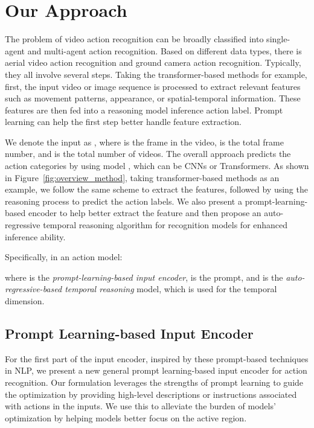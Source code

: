 \documentclass[letterpaper, 10 pt, conference]{ieeeconf}
\begin{document}
 

\section{Our Approach}
The problem of video action recognition can be broadly classified into single-agent and multi-agent action recognition. Based on different data types, there is aerial video action recognition and ground camera action recognition. Typically, they all involve several steps. Taking the transformer-based methods for example,  first, the input video or image sequence is processed to extract relevant features such as movement patterns, appearance, or spatial-temporal information. These features are then fed into a reasoning model inference action label.  Prompt learning can help the first step better handle feature extraction.



We denote the input as , where  is the  frame in the  video,  is the total frame number, and  is the total number of videos. The overall approach predicts the action categories by using model , which can be CNNs or Transformers. As shown in Figure~\ref{fig:overview_method}, taking transformer-based methods as an example, we follow the same scheme to extract the features, followed by using the reasoning process to predict the action labels. We also present a prompt-learning-based encoder to help better extract the feature and then propose an auto-regressive temporal reasoning algorithm for recognition models for enhanced inference ability.

Specifically, in an action model:
 
 where  is the \emph{prompt-learning-based input encoder},  is the prompt, and  is the \emph{auto-regressive-based temporal reasoning} model, which is used for the temporal dimension. 
 


\subsection{Prompt Learning-based Input Encoder}
For the first part of the input encoder, inspired by these prompt-based techniques in NLP, we present a new general prompt learning-based input encoder for action recognition. Our formulation leverages the strengths of prompt learning to guide the optimization by providing high-level descriptions or instructions associated with actions in the inputs. We use this to alleviate the burden of models' optimization by helping models better focus on the active region. 
 
\end{document}
